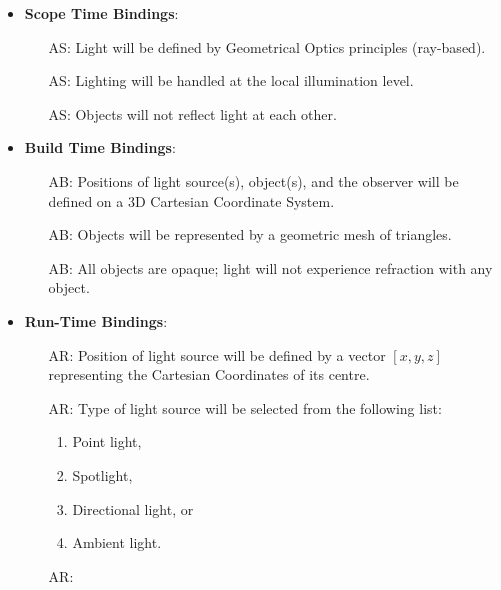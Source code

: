 \documentclass[12pt]{article}
\newcounter{assumpnum} %
\newcounter{assumpnumS} %
\newcounter{assumpnumB} %
\newcounter{assumpnumR} %
\begin{document}
\begin{itemize}
	\item \textbf{Scope Time Bindings}:
	\begin{itemize}
		\item[AS\refstepcounter{assumpnumS}\theassumpnumS\label{geometrical_appx}:]
		Light will be defined by Geometrical Optics principles (ray-based).
		\item[AS\refstepcounter{assumpnumS}\theassumpnumS\label{illumination}:] 
		Lighting will be handled at the local illumination level.
		\item[AS\refstepcounter{assumpnumS}\theassumpnumS\label{illum_constraint}:]
		Objects will not reflect light at each other.
	\end{itemize}
	\item \textbf{Build Time Bindings}:
	\begin{itemize}
		\item[AB\refstepcounter{assumpnumB}\theassumpnumB\label{coordinates}:]
		Positions of light source(s), object(s), and the observer will be 
		defined on a 3D Cartesian Coordinate System.
		\item[AB\refstepcounter{assumpnumB}\theassumpnumB\label{object_representation}:]
		Objects will be represented by a geometric mesh of triangles.		
		\item[AB\refstepcounter{assumpnumB}\theassumpnumB\label{object_refraction}:]
		All objects are opaque; light will not experience refraction with any 
		object.			
	\end{itemize}
	\item \textbf{Run-Time Bindings}:
	\begin{itemize}
		\item[AR\refstepcounter{assumpnumR}\theassumpnumR\label{light_position}:]
		Position of light source will be defined by a vector $[x, y, z]$ 
		representing the Cartesian Coordinates of its centre.
		\item[AR\refstepcounter{assumpnumR}\theassumpnumR\label{light_type}:]
		Type of light source will be selected from the following list:
		\begin{enumerate}
			\item Point light,
			\item Spotlight,
			\item Directional light, or
			\item Ambient light.
		\end{enumerate}
		\item[AR\refstepcounter{assumpnumR}\theassumpnumR\label{light_colour}:]

\end{itemize}
\end{itemize}
\end{document}

